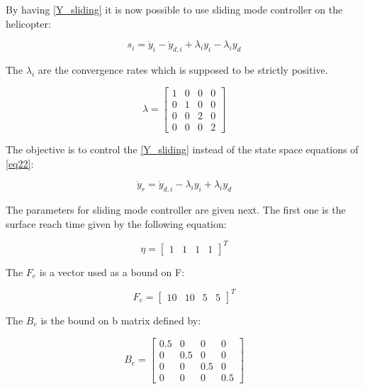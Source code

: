 By having \ref{Y_sliding} it is now possible to use sliding mode controller on the helicopter:

\begin{equation}
	s_i=\dot{y}_i-\dot{y}_{d,i}+\lambda_i y_i-\lambda_i y_d 
\end{equation}

The $\lambda_i$ are the convergence rates which is supposed to be strictly positive.

\begin{equation}\label{lambda}
	\lambda=
	\begin{bmatrix}
		1& 0 & 0 & 0\\
		0 &1 & 0 & 0\\
		0 & 0 & 2 & 0\\
		0 & 0 & 0 & 2
	\end{bmatrix}
\end{equation}

The objective is to control the \ref{Y_sliding} instead of the state space equations of \ref{eq22}: 

\begin{equation}
	\dot{y}_r= \dot{y}_{d,i}-\lambda_i y_i+\lambda_i y_d
\end{equation}

The parameters for sliding mode controller are given next. The first one is the surface reach time given by the following equation:

\begin{equation} \label{eta}
	\eta =
	\begin{bmatrix}
		1&
		1&
		1&
		1
	\end{bmatrix}^T
\end{equation}

The $F_e$ is a vector used as a bound on F:

\begin{equation}\label{F_e}
	F_e =
	\begin{bmatrix}
		10&
		10&
		5&
		5
	\end{bmatrix}^T
\end{equation}

The $B_e$ is the bound on b matrix defined by:

\begin{equation}\label{B_e}
	B_e=
	\begin{bmatrix}
		0.5& 0 & 0 & 0\\
		0 &0.5 & 0 & 0\\
		0 & 0 & 0.5 & 0\\
		0 & 0 & 0 & 0.5
	\end{bmatrix}
\end{equation}

